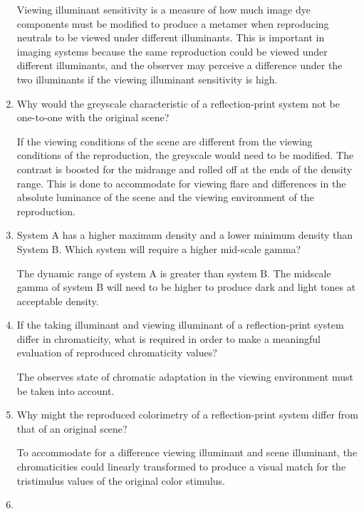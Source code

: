 \begin{enumerate}
 \par Viewing illuminant sensitivity is a measure of how much image dye components must be modified to produce a metamer when reproducing neutrals to be viewed under different illuminants.   This is important in imaging systems because the same reproduction could be viewed under different illuminants, and the observer may perceive a difference under the two illuminants if the viewing illuminant sensitivity is high. \newline
 \item
 Why would the greyscale characteristic of a reflection-print system not be one-to-one with the original scene? \newline
 \par If the viewing conditions of the scene are different from the viewing conditions of the reproduction, the greyscale would need to be modified.  The contrast is boosted for the midrange and rolled off at the ends of the density range.  This is done to accommodate for viewing flare and differences in the absolute luminance of the scene and the viewing environment of the reproduction.
 \item
  System A has a higher maximum density and a lower minimum density than System B. Which system will require a higher mid-scale gamma? \newline
 \par The dynamic range of system A is greater than system B.  The midscale gamma of system B will need to be higher to produce dark and light tones at acceptable density.
 \item
  If the taking illuminant and viewing illuminant of a reflection-print system differ in chromaticity, what is required in order to make a meaningful evaluation of reproduced chromaticity values? \newline
 \par The observes state of chromatic adaptation in the viewing environment must be taken into account. \newline
 \item
  Why might the reproduced colorimetry of a reflection-print system differ from that of an original scene? \newline
 \par To accommodate for a difference viewing illuminant and scene illuminant, the chromaticities could linearly transformed to produce a visual match for the tristimulus values of the original color stimulus. \newline
 \item

\end{enumerate}
